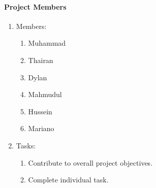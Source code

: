 \documentclass[12pt,a4paper]{article}
\begin{document}
\begin{appendices}
      \paragraph{Project Members}    
        \begin{enumerate}
          \item Members:
            \begin{enumerate}
              \item Muhammad
              \item Thairan
              \item Dylan
              \item Mahmudul
              \item Hussein
              \item Mariano
            \end{enumerate}  
          \item Tasks:
          \begin{enumerate}
            \item Contribute to overall project objectives.
            \item Complete individual task.
          \end{enumerate}  
        \end{enumerate}
    \end{appendices}
\end{document}
